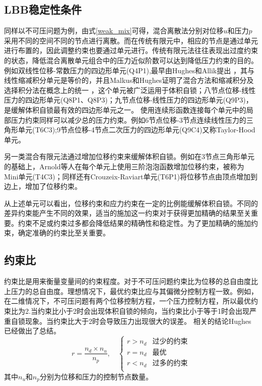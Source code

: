 \subsection{LBB稳定性条件}
同样以不可压问题为例，由式\eqref{weak_mix}可得，混合离散法分别对位移$u$和压力$p$采用不同的空间不同的节点进行离散。而在传统有限元中，相应的节点是通过单元进行布置的，因此调整约束也要通过单元进行。传统有限元法往往表现出过度约束的状态，降低混合离散单元组合中的压力近似阶数可以达到降低压力约束的目的。
例如双线性位移-常数压力的四边形单元(Q4P1),最早由Hughes和Allik提出
，其与线性缩减积分单元是等价的，并且Malkus和Hughes证明了混合方法和缩减积分及选择积分法在概念上的统一
，这个单元被广泛运用于体积自锁；八节点位移-线性压力的四边形单元(Q8P1、Q8P3)；九节点位移-线性压力的四边形单元(Q9P3)，是缓解体积自锁最有效的四边形单元之一。
使用连续形函数连接每个单元中的局部压力约束同样可以减少总的压力约束。例如6节点位移-3节点连续线性压力的三角形单元(T6C3);9节点位移-4节点二次压力的四边形单元(Q9C4)又称Taylor-Hood单元。

另一类混合有限元法通过增加位移约束来缓解体积自锁。例如在3节点三角形单元的基础上，Arnold等人在每个单元上使用三阶泡泡函数增加位移约束，被称为Mini单元(T4C3)；同样还有Crouzeix-Raviart单元(T6P1)将位移节点由顶点增加到边上，增加了位移约束。

从上述单元可以看出，位移约束和应力约束在一定的比例能缓解体积自锁。不同的差异约束能产生不同的效果，适当的施加这一约束对于获得更加精确的结果至关重要。约束不足或约束过多都会降低结果的精确性和稳定性。为了更加精确的施加约束，确定准确的约束比至关重要。
\subsection{约束比}
约束比是用来衡量变量间的约束程度。对于不可压问题约束比为位移的总自由度比上压力的总自由度。理想情况下，最优约束比应与其偏微分控制方程一致。例如，在二维情况下，不可压问题有两个位移控制方程，一个压力控制方程，所以最优约束比为2.当约束比小于2时会出现体积自锁的倾向，当约束比小于等于1时会出现严重自锁现象。当约束比大于2时会导致压力出现很大的误差。
相关的结论Hughes已经做出了总结\cite{hughes2000}。
\begin{equation}
    r = \frac{n_d\times n_u}{n_p}, \quad 
    \begin{cases}
        r > n_d & \text{过少的约束} \\
        r = n_d & \text{最优} \\
        r < n_d & \text{过多的约束} \\
    \end{cases}
\end{equation}
其中$n_u$和$n_p$分别为位移和压力的控制节点数量。


